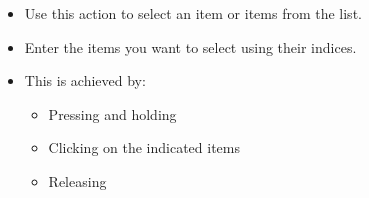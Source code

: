 \begin{itemize}
\item Use this action to select an item or items from the list. 
\item Enter the items you want to select using their indices.
\item This is achieved by:
\begin{itemize}
\item Pressing and holding 
\item Clicking on the indicated items
\item Releasing 
\end{itemize}
\end{itemize}
